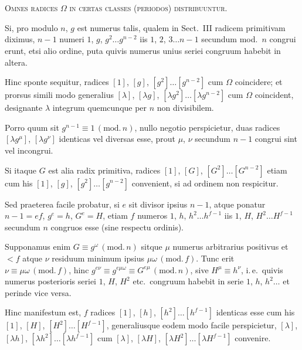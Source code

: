 \documentclass[12pt,a4paper]{article}
\theoremstyle{plain}
\theoremstyle{definition}
\theoremstyle{remark}
\begin{document}
\section{}

\textsc{Omnes radices $\Omega$ in certas classes (periodos) distribuuntur.}

Si, pro modulo $n$, $g$ est numerus talis, qualem in Sect.\ III radicem primitivam diximus, $n-1$ numeri $1$, $g$, $g^2\ldots g^{n-2}$ iis $1$, $2$, $3\ldots n-1$ secundum mod.\ $n$ congrui erunt, etsi alio ordine, puta quivis numerus unius seriei congruum habebit in altera.

Hinc sponte sequitur, radices $[1]$, $[g]$, $[g^2]\ldots[g^{n-2}]$ cum $\Omega$ coincidere; et prorsus simili modo generalius $[\lambda]$, $[\lambda g]$, $[\lambda g^2]\ldots[\lambda g^{n-2}]$ cum $\Omega$ coincident, designante $\lambda$ integrum quemcunque per $n$ non divisibilem.

Porro quum sit $g^{n-1}\equiv 1\,(\mathrm{mod.}\,n)$, nullo negotio perspicietur, duas radices $[\lambda g^\mu]$, $[\lambda g^\nu]$ identicas vel diversas esse, prout $\mu$, $\nu$ secundum $n-1$ congrui sint vel incongrui.

Si itaque $G$ est alia radix primitiva, radices $[1]$, $[G]$, $[G^2]\ldots[G^{n-2}]$ etiam cum his $[1]$, $[g]$, $[g^2]\ldots[g^{n-2}]$ convenient, si ad ordinem non respicitur.

Sed praeterea facile probatur, si $e$ sit divisor ipsius $n-1$, atque ponatur $n-1=ef$, $g^e=h$, $G^e=H$, etiam $f$ numeros $1$, $h$, $h^2\ldots h^{f-1}$ iis $1$, $H$, $H^2\ldots H^{f-1}$ secundum $n$ congruos esse (sine respectu ordinis).

Supponamus enim $G\equiv g^\omega\,(\mathrm{mod.}\,n)$ sitque $\mu$ numerus arbitrarius positivus et $<f$ atque $\nu$ residuum minimum ipsius $\mu\omega\,(\mathrm{mod.}\,f)$. Tunc erit $\nu\equiv\mu\omega\,(\mathrm{mod.}\,f)$, hinc $g^{e\nu}\equiv g^{e\mu\omega}\equiv G^{e\mu}\,(\mathrm{mod.}\,n)$, sive $H^\mu\equiv h^\nu$, i.\,e.\ quivis numerus posterioris seriei $1$, $H$, $H^2$ etc.\ congruum habebit in serie $1$, $h$, $h^2\ldots$ et perinde vice versa.

Hinc manifestum est, $f$ radices $[1]$, $[h]$, $[h^2]\ldots[h^{f-1}]$ identicas esse cum his $[1]$, $[H]$, $[H^2]\ldots[H^{f-1}]$, generaliusque eodem modo facile perspicietur, $[\lambda]$, $[\lambda h]$, $[\lambda h^2]\ldots[\lambda h^{f-1}]$ cum $[\lambda]$, $[\lambda H]$, $[\lambda H^2]\ldots[\lambda H^{f-1}]$ convenire.
\end{document}
